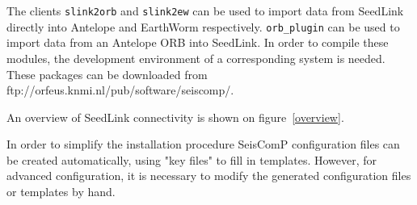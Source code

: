 \documentclass[11pt,a4paper,titlepage]{article}
\begin{document}
The clients \verb+slink2orb+ and \verb+slink2ew+ can be used to import
data from SeedLink directly into Antelope and EarthWorm respectively.
\verb+orb_plugin+ can be used to import data from an Antelope ORB into
SeedLink. In order to compile these modules, the development
environment of a corresponding system is needed. These packages can be
downloaded from ftp://orfeus.knmi.nl/pub/software/seiscomp/.

An overview of SeedLink connectivity is shown on figure~\ref{overview}.

In order to simplify the installation procedure SeisComP configuration
files can be created automatically, using "key files" to fill in
templates.  However, for advanced configuration, it is necessary to
modify the generated configuration files or templates by hand.
\end{document}

